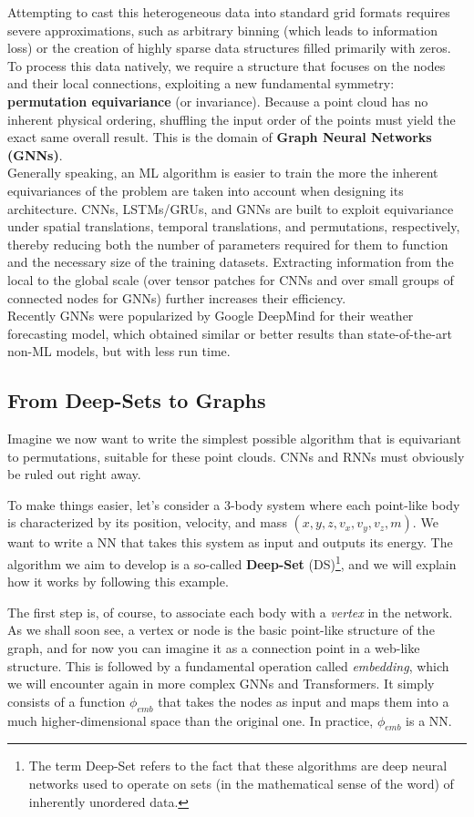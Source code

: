 Attempting to cast this heterogeneous data into standard grid formats requires severe approximations, such as arbitrary binning (which leads to information loss) or the creation of highly sparse data structures filled primarily with zeros. To process this data natively, we require a structure that focuses on the nodes and their local connections, exploiting a new fundamental symmetry: \textbf{permutation equivariance} (or invariance). Because a point cloud has no inherent physical ordering, shuffling the input order of the points must yield the exact same overall result. This is the domain of \textbf{Graph Neural Networks (GNNs)}. \\ 
Generally speaking, an ML algorithm is easier to train the more the inherent equivariances of the problem are taken into account when designing its architecture. CNNs, LSTMs/GRUs, and GNNs are built to exploit equivariance under spatial translations, temporal translations, and permutations, respectively, thereby reducing both the number of parameters required for them to function and the necessary size of the training datasets. Extracting information from the local to the global scale (over tensor patches for CNNs and over small groups of connected nodes for GNNs) further increases their efficiency.\\
Recently GNNs were popularized by Google DeepMind for their weather forecasting model, which obtained similar or better results than state-of-the-art non-ML models, but with less run time.

\subsection{From Deep-Sets to Graphs}
Imagine we now want to write the simplest possible algorithm that is equivariant to permutations, suitable for these point clouds. CNNs and RNNs must obviously be ruled out right away. 

To make things easier, let's consider a 3-body system where each point-like body is characterized by its position, velocity, and mass $(x, y, z, v_x, v_y, v_z, m)$. We want to write a NN that takes this system as input and outputs its energy. The algorithm we aim to develop is a so-called \textbf{Deep-Set} (DS)\footnote{The term Deep-Set refers to the fact that these algorithms are deep neural networks used to operate on sets (in the mathematical sense of the word) of inherently unordered data.}, and we will explain how it works by following this example.

The first step is, of course, to associate each body with a \textit{vertex} in the network. As we shall soon see, a vertex or node is the basic point-like structure of the graph, and for now you can imagine it as a connection point in a web-like structure. This is followed by a fundamental operation called \textit{embedding}, which we will encounter again in more complex GNNs and Transformers. It simply consists of a function $\phi_{emb}$ that takes the nodes as input and maps them into a much higher-dimensional space than the original one. In practice, $\phi_{emb}$ is a NN. 

